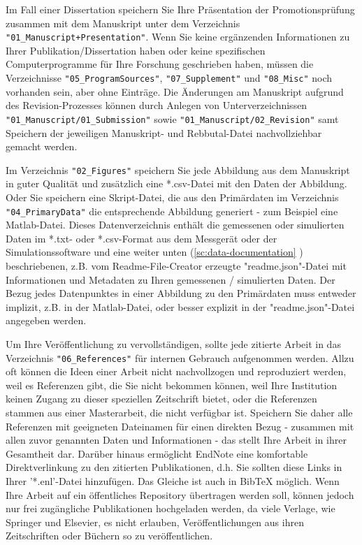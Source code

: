Im Fall einer Dissertation speichern Sie Ihre Präsentation der Promotionsprüfung zusammen mit dem Manuskript unter dem Verzeichnis \texttt{"01\_Manuscript+Presentation"}. Wenn Sie keine ergänzenden Informationen zu Ihrer Publikation/Dissertation haben oder keine spezifischen Computerprogramme für Ihre Forschung geschrieben haben, müssen die Verzeichnisse \linebreak
\texttt{"05\_ProgramSources"}, \texttt{"07\_Supplement"} und \texttt{"08\_Misc"} noch vorhanden sein, aber ohne Einträge. Die Änderungen am Manuskript aufgrund des Revision-Prozesses können durch Anlegen von Unterverzeichnissen \texttt{"01\_Manuscript/01\_Submission"} sowie \linebreak
\texttt{"01\_Manuscript/02\_Revision"} samt Speichern der jeweiligen Manuskript- und Rebbutal-Datei nachvollziehbar gemacht werden.

Im Verzeichnis \texttt{"02\_Figures"} speichern Sie jede Abbildung aus dem Manuskript in guter Qualität und zusätzlich eine *.csv-Datei mit den Daten der Abbildung. Oder Sie speichern eine Skript-Datei, die aus den Primärdaten im Verzeichnis \texttt{"04\_PrimaryData"} die entsprechende Abbildung generiert - zum Beispiel eine Matlab-Datei. Dieses Datenverzeichnis enthält die gemessenen oder simulierten Daten im *.txt- oder *.csv-Format aus dem Messgerät oder der Simulationssoftware und eine weiter unten (\ref{sc:data-documentation}  ) beschriebenen, z.B. vom Readme-File-Creator erzeugte "readme.json"-Datei mit Informationen und Metadaten zu Ihren gemessenen / simulierten Daten. Der Bezug jedes Datenpunktes in einer Abbildung zu den Primärdaten muss entweder implizit, z.B. in der Matlab-Datei, oder besser explizit in der "readme.json"-Datei angegeben werden.

Um Ihre Veröffentlichung zu vervollständigen, sollte jede zitierte Arbeit in das Verzeichnis \texttt{"06\_References"} für internen Gebrauch aufgenommen werden. Allzu oft können die Ideen einer Arbeit nicht nachvollzogen und reproduziert werden, weil es Referenzen gibt, die Sie nicht bekommen können, weil Ihre
Institution keinen Zugang zu dieser speziellen Zeitschrift bietet, oder die Referenzen stammen aus einer Masterarbeit, die nicht verfügbar ist. Speichern Sie daher alle Referenzen mit geeigneten Dateinamen für einen direkten Bezug - zusammen mit allen zuvor genannten Daten und Informationen - das stellt Ihre Arbeit in ihrer Gesamtheit dar. Darüber hinaus ermöglicht EndNote eine komfortable Direktverlinkung zu den zitierten Publikationen, d.h. Sie sollten diese Links in Ihrer '*.enl'-Datei hinzufügen. Das Gleiche ist auch in BibTeX
möglich. Wenn Ihre Arbeit auf ein öffentliches Repository übertragen werden soll, können jedoch nur frei zugängliche Publikationen hochgeladen werden, da viele Verlage, wie Springer und Elsevier, es nicht erlauben, Veröffentlichungen aus ihren Zeitschriften oder Büchern so zu veröffentlichen.

